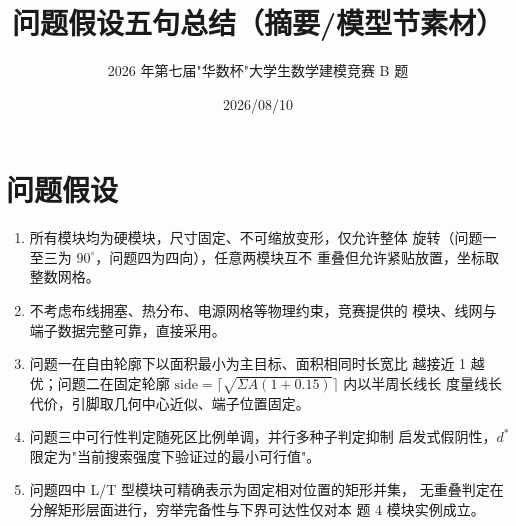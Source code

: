 \documentclass[12pt,a4paper]{article}
\title{\textbf{问题假设五句总结（摘要/模型节素材）}}
\author{2026 年第七届"华数杯"大学生数学建模竞赛 B 题}
\date{2026/08/10}
\begin{document}
\maketitle

\section*{问题假设}

\begin{enumerate}[label=\arabic*., leftmargin=2em]
    \item 所有模块均为硬模块，尺寸固定、不可缩放变形，仅允许整体
    旋转（问题一至三为 $90^\circ$，问题四为四向），任意两模块互不
    重叠但允许紧贴放置，坐标取整数网格。
    \item 不考虑布线拥塞、热分布、电源网格等物理约束，竞赛提供的
    模块、线网与端子数据完整可靠，直接采用。
    \item 问题一在自由轮廓下以面积最小为主目标、面积相同时长宽比
    越接近 1 越优；问题二在固定轮廓
    $\text{side}=\lceil\sqrt{\Sigma A(1+0.15)}\rceil$ 内以半周长线长
    度量线长代价，引脚取几何中心近似、端子位置固定。
    \item 问题三中可行性判定随死区比例单调，并行多种子判定抑制
    启发式假阴性，$d^*$ 限定为"当前搜索强度下验证过的最小可行值"。
    \item 问题四中 L/T 型模块可精确表示为固定相对位置的矩形并集，
    无重叠判定在分解矩形层面进行，穷举完备性与下界可达性仅对本
    题 4 模块实例成立。
\end{enumerate}
\end{document}
